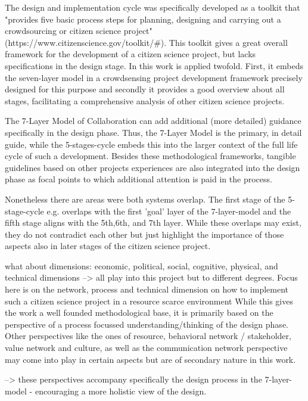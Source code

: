 The design and implementation cycle was specifically developed as a toolkit that "provides five basic process steps for planning, designing and carrying out a crowdsourcing or citizen science project" (https://www.citizenscience.gov/toolkit/#). This toolkit gives a great overall framework for the development of a citizen science project, but lacks specifications in the design stage. In this work is applied twofold. First, it embeds the seven-layer model in a crowdsensing project development framework precisely designed for this purpose and secondly it provides a good overview about all stages, facilitating a comprehensive analysis of other citizen science projects. 


The 7-Layer Model of Collaboration can add additional (more detailed) guidance specifically in the design phase. Thus, the 7-Layer Model is the primary, in detail guide, while the 5-stages-cycle embeds this into the larger context of the full life cycle of such a development.
Besides these methodological frameworks, tangible guidelines based on other projects experiences are also integrated into the design phase as focal points to which additional attention is paid in the process.

Nonetheless there are areas were both systems overlap. The first stage of the 5-stage-cycle e.g. overlaps with the first 'goal' layer of the 7-layer-model and the fifth stage aligns with the 5th,6th, and 7th layer. While these overlaps may exist, they do not contradict each other but just highlight the importance of those aspects also in later stages of the citizen science project.

what about dimensions: economic, political, social, cognitive, physical, and technical dimensions
--> all play into this project but to different degrees. Focus here is on the network, process and technical dimension on how to implement such a citizen science project in a resource scarce environment
While this gives the work a well founded methodological base, it is primarily based on the perspective of a process focussed understanding/thinking of the design phase. Other perspectives like the ones of resource, behavioral network / stakeholder, value network and culture, as well as the communication network perspective may come into play in certain aspects but are of secondary nature in this work.

--> these perspectives accompany specifically the design process in the 7-layer-model - encouraging a more holistic view of the design.





